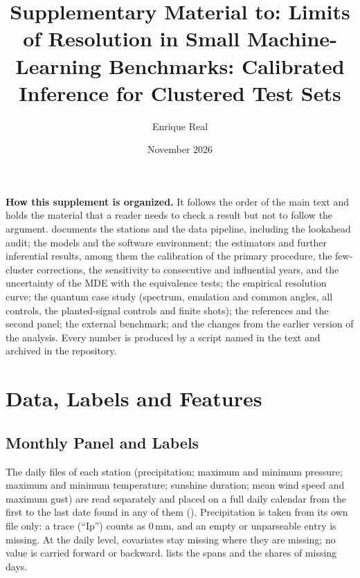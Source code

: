 \documentclass[11pt,a4paper]{article}
\title{\textbf{Supplementary Material to: Limits of Resolution in Small Machine-Learning Benchmarks: Calibrated Inference for Clustered Test Sets}}
\author[1,*]{Enrique Real}
\affil[1]{Independent Researcher, Alicante, Spain. ORCID: \href{https://orcid.org/0009-0006-3862-9797}{0009-0006-3862-9797}}
\affil[*]{\textit{Corresponding author: enriquerb32@gmail.com}}
\date{November 2026}
\begin{document}
\maketitle
\renewcommand{\thesection}{S\arabic{section}}
\setcounter{section}{0}
\renewcommand{\thetable}{S\arabic{table}}
\renewcommand{\thefigure}{S\arabic{figure}}
\renewcommand{\theequation}{S\arabic{equation}}

\noindent\textbf{How this supplement is organized.} It follows the order of the main text and holds the material that a reader needs to check a result but not to follow the argument.  documents the stations and the data pipeline, including the lookahead audit;  the models and the software environment;  the estimators and further inferential results, among them the calibration of the primary procedure, the few-cluster corrections, the sensitivity to consecutive and influential years, and the uncertainty of the MDE with the equivalence tests;  the empirical resolution curve;  the quantum case study (spectrum, emulation and common angles, all controls, the planted-signal controls and finite shots);  the references and the second panel;  the external benchmark; and  the changes from the earlier version of the analysis. Every number is produced by a script named in the text and archived in the repository.

\section{Data, Labels and Features}
\label{app:pipeline}

\subsection{Monthly Panel and Labels}

The daily files of each station (precipitation; maximum and minimum pressure; maximum and minimum temperature; sunshine duration; mean wind speed and maximum gust) are read separately and placed on a full daily calendar from the first to the last date found in any of them (). Precipitation is taken from its own file only: a trace (``Ip'') counts as 0\,mm, and an empty or unparseable entry is missing. At the daily level, covariates stay missing where they are missing; no value is carried forward or backward.  lists the spans and the shares of missing days.
\end{document}
